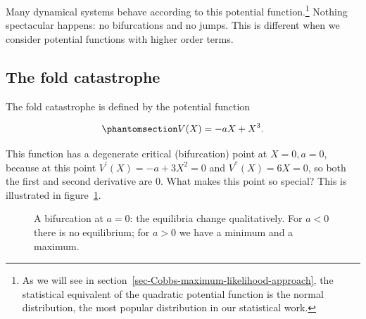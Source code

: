 \documentclass[
  a4paper,
  DIV=11,
  numbers=noendperiod,
  oneside]{scrreprt}
\begin{document}
Many dynamical systems behave according to this potential
function.\footnote{As we will see in
  section~\ref{sec-Cobbs-maximum-likelihood-approach}, the statistical
  equivalent of the quadratic potential function is the normal
  distribution, the most popular distribution in our statistical work.}
Nothing spectacular happens: no bifurcations and no jumps. This is
different when we consider potential functions with higher order terms.

\subsection{The fold catastrophe}\label{sec-The-fold-catastrophe}

The fold catastrophe is defined by the potential function

\begin{equation}\phantomsection\label{eq-ch3-3-old-7}{
V(X) = {- aX + X}^{3}.
}\end{equation}

This function has a degenerate critical (bifurcation) point at
\(X = 0, a = 0\), because at this point \(V^{'}(X) = - a + 3X^{2} = 0\)
and \(V^{''}(X) = 6X = 0\), so both the first and second derivative are
0. What makes this point so special? This is illustrated in
figure~\ref{fig-ch3-img4-old-16}.

\begin{figure}


\caption{\label{fig-ch3-img4-old-16}A bifurcation at \(a = 0\): the
equilibria change qualitatively. For \(a<0\) there is no equilibrium;
for \(a>0\) we have a minimum and a maximum.}

\end{figure}%
\end{document}
